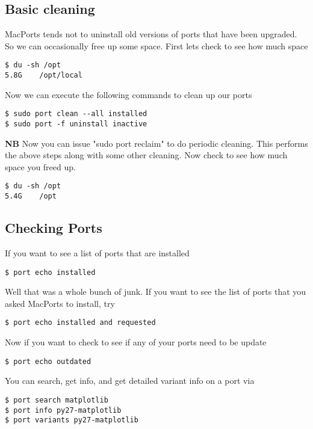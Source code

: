 \documentclass[11pt, A4paper]{article}
\begin{document}
\subsection{Basic cleaning}
MacPorts tends not to uninstall old versions of ports that have been upgraded. So we can occasionally free up some space. First lets check to see how much space
\begin{lstlisting}[style=Bash]
$ du -sh /opt
5.8G	/opt/local
\end{lstlisting}
Now we can execute the following commands to clean up our ports
\begin{lstlisting}[style=Bash]
$ sudo port clean --all installed
$ sudo port -f uninstall inactive
\end{lstlisting}
{\bf NB} Now you can issue "sudo port reclaim" to do periodic cleaning. This performs the above steps along with some other cleaning.
Now check to see how much space you freed up.
\begin{lstlisting}[style=Bash]
$ du -sh /opt
5.4G	/opt
\end{lstlisting}


\subsection{Checking Ports}
If you want to see a list of ports that are installed
\begin{lstlisting}[style=Bash]
$ port echo installed
\end{lstlisting}
Well that was a whole bunch of junk. If you want to see the list of ports that you asked MacPorts to install, try
\begin{lstlisting}[style=Bash]
$ port echo installed and requested
\end{lstlisting}
Now if you want to check to see if any of your ports need to be update
\begin{lstlisting}[style=Bash]
$ port echo outdated
\end{lstlisting}
You can search, get info, and get detailed variant info on a port via
\begin{lstlisting}[style=Bash]
$ port search matplotlib
$ port info py27-matplotlib
$ port variants py27-matplotlib
\end{lstlisting}
\end{document}
